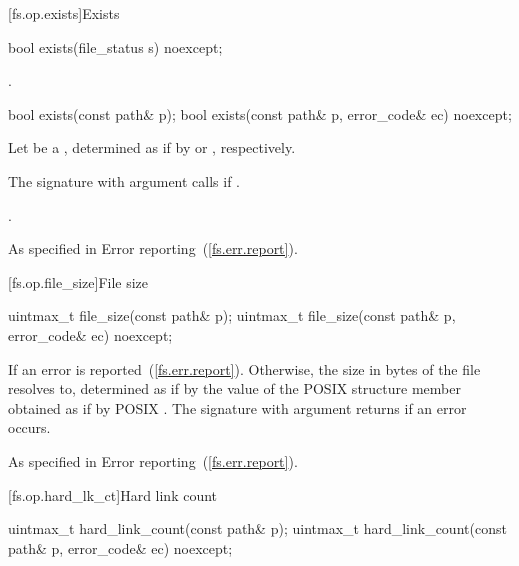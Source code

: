[fs.op.exists]{Exists}

%
\begin{itemdecl}
bool exists(file_status s) noexcept;
\end{itemdecl}

\begin{itemdescr}
\pnum
\returns {}.
\end{itemdescr}

%
\begin{itemdecl}
bool exists(const path& p);
bool exists(const path& p, error_code& ec) noexcept;
\end{itemdecl}

\begin{itemdescr}
\pnum
Let  be a ,
determined as if by  or , respectively.

\pnum
\effects The signature with argument  calls 
if .

\pnum
\returns {}.

\pnum
\throws As specified in Error reporting~(\ref{fs.err.report}).
\end{itemdescr}


[fs.op.file_size]{File size}

%
\begin{itemdecl}
uintmax_t file_size(const path& p);
uintmax_t file_size(const path& p, error_code& ec) noexcept;
\end{itemdecl}

\begin{itemdescr}
\pnum
\returns If 
  an error is reported~(\ref{fs.err.report}). Otherwise, the size in bytes of the file
   resolves to, determined as if by the value of the POSIX 
  structure member  obtained as if by POSIX .
   The signature
  with argument  returns 
  if an error occurs.

\pnum
\throws As specified in Error reporting~(\ref{fs.err.report}).
\end{itemdescr}


[fs.op.hard_lk_ct]{Hard link count}

%
\begin{itemdecl}
uintmax_t hard_link_count(const path& p);
uintmax_t hard_link_count(const path& p, error_code& ec) noexcept;
\end{itemdecl}


